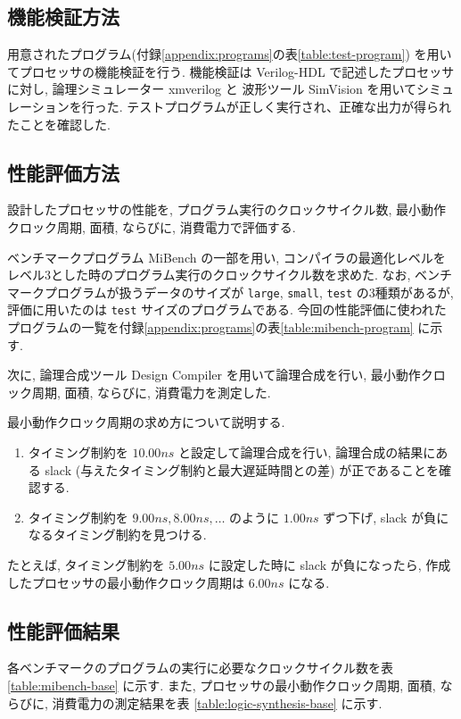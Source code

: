 \documentclass[../main.tex]{subfiles}
\begin{document}
  \subsection{機能検証方法}
  用意されたプログラム(付録\ref{appendix:programs}の表\ref{table:test-program})
  を用いてプロセッサの機能検証を行う.
  機能検証は Verilog-HDL で記述したプロセッサに対し, 
  論理シミュレーター xmverilog と
  波形ツール SimVision を用いてシミュレーションを行った.
  テストプログラムが正しく実行され、正確な出力が得られたことを確認した.

  \subsection{性能評価方法}
  設計したプロセッサの性能を, プログラム実行のクロックサイクル数, 
  最小動作クロック周期, 面積, ならびに, 消費電力で評価する.

  ベンチマークプログラム MiBench \cite{mibench} の一部を用い, 
  コンパイラの最適化レベルをレベル3とした時のプログラム実行のクロックサイクル数を求めた.
  なお, ベンチマークプログラムが扱うデータのサイズが \verb|large|, \verb|small|, \verb|test| の3種類があるが, 
  評価に用いたのは \verb|test| サイズのプログラムである.
  今回の性能評価に使われたプログラムの一覧を付録\ref{appendix:programs}の表\ref{table:mibench-program} に示す.

  次に, 論理合成ツール Design Compiler を用いて論理合成を行い, 
  最小動作クロック周期, 面積, ならびに, 消費電力を測定した.

  最小動作クロック周期の求め方について説明する.
  \begin{enumerate}
    \item タイミング制約を $10.00\unit{ns}$ と設定して論理合成を行い, 
    論理合成の結果にある slack (与えたタイミング制約と最大遅延時間との差) が正であることを確認する.
    \item タイミング制約を $9.00\unit{ns}, 8.00\unit{ns}, \ldots$ のように $1.00\unit{ns}$ ずつ下げ, 
    slack が負になるタイミング制約を見つける.
  \end{enumerate}

  たとえば, タイミング制約を $5.00\unit{ns}$ に設定した時に slack が負になったら, 
  作成したプロセッサの最小動作クロック周期は $6.00\unit{ns}$ になる.

  \subsection{性能評価結果}
  各ベンチマークのプログラムの実行に必要なクロックサイクル数を表 \ref{table:mibench-base} に示す.
  また, プロセッサの最小動作クロック周期, 面積, ならびに, 消費電力の測定結果を表 \ref{table:logic-synthesis-base} に示す.
\end{document}
